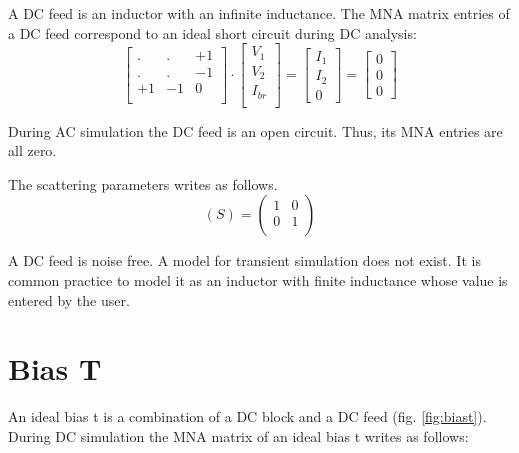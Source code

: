A DC feed is an inductor with an infinite inductance. The MNA
matrix entries of a DC feed correspond to an ideal short
circuit during DC analysis:
\begin{equation}
\begin{bmatrix}
. & . & +1\\
. & . & -1\\
+1 & -1 & 0\\
\end{bmatrix}
\cdot
\begin{bmatrix}
V_1\\
V_2\\
I_{br}\\
\end{bmatrix}
=
\begin{bmatrix}
I_1\\
I_2\\
0
\end{bmatrix}
=
\begin{bmatrix}
0\\
0\\
0
\end{bmatrix}
\end{equation}

During AC simulation the DC feed is an open circuit. Thus, its MNA
entries are all zero.

\addvspace{12pt}

The scattering parameters writes as follows.
\begin{equation}
(S) =
\begin{pmatrix}
1 & 0\\
0 & 1\\
\end{pmatrix}
\end{equation}

A DC feed is noise free. A model for transient simulation does not
exist. It is common practice to model it as an inductor with finite
inductance whose value is entered by the user.


\section{Bias T}

An ideal bias t is a combination of a DC block and a DC feed
(fig. \ref{fig:biast}). During DC simulation the MNA matrix
of an ideal bias t writes as follows:

